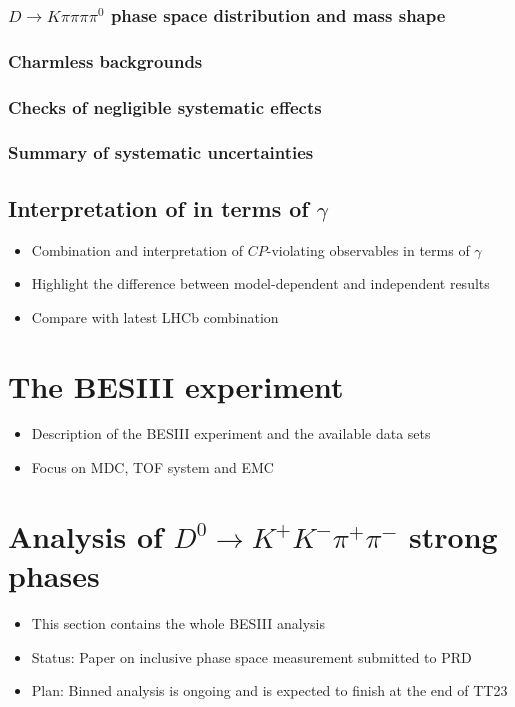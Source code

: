 \documentclass[12pt, a4paper, notitlepage, onecolumn]{article}
\begin{document}
\subsubsection{\texorpdfstring{$D\to K\pi\pi\pi\pi^0$}{D2Kpipipipi0} phase space distribution and mass shape}
\subsubsection{Charmless backgrounds}
\subsubsection{Checks of negligible systematic effects}
\subsubsection{Summary of systematic uncertainties}
\subsection{Interpretation of in terms of \texorpdfstring{$\gamma$}{gamma}}
  \begin{itemize}[nosep]
    \setlength{\itemindent}{2em}
    \item[\textendash]{Combination and interpretation of $C\!P$-violating observables in terms of $\gamma$}
    \item[\textendash]{Highlight the difference between model-dependent and independent results}
    \item[\textendash]{Compare with latest LHCb combination}
  \end{itemize}

\section{The BESIII experiment}
  \begin{itemize}[nosep]
    \setlength{\itemindent}{0em}
    \item{Description of the BESIII experiment and the available data sets}
    \item{Focus on MDC, TOF system and EMC}
  \end{itemize}

\section{Analysis of \texorpdfstring{$D^0\to K^+K^-\pi^+\pi^-$}{D02KKpipi} strong phases}
  \begin{itemize}[nosep]
    \setlength{\itemindent}{0em}
    \item{This section contains the whole BESIII analysis}
    \item{Status: Paper on inclusive phase space measurement submitted to PRD}
    \item{Plan: Binned analysis is ongoing and is expected to finish at the end of TT23}
  \end{itemize}
\end{document}
